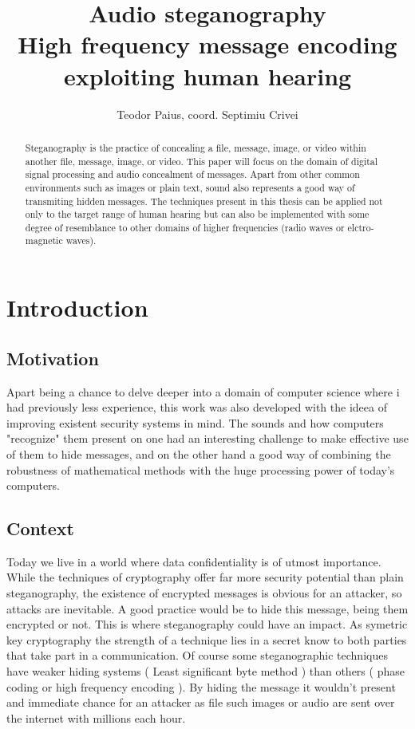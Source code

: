 \documentclass[12pt]{report}
\begin{document}
\title{%
  Audio steganography \\
  \large High frequency message encoding \\
    exploiting human hearing}

\author{Teodor Paius, coord. Septimiu Crivei}

\maketitle

\begin{abstract}
Steganography is the practice of concealing a file, message, image, or video within another file, message, image, or video. This paper will focus on the domain of digital signal processing and audio concealment of messages. Apart from other common environments such as images or plain text, sound also represents a good way of transmiting hidden messages. The techniques present in this thesis can be applied not only to the target range of human hearing but can also be implemented with some degree of resemblance to other domains of higher frequencies (radio waves or elctro-magnetic waves).
\end{abstract}

\tableofcontents


\chapter{Introduction}
\section{Motivation}
Apart being a chance to delve deeper into a domain of computer science where i had previously less experience, this work was also developed with the ideea of improving existent security systems in mind. The sounds and how computers "recognize" them present on one had an interesting challenge to make effective use of them to hide messages, and on the other hand a good way of combining the robustness of mathematical methods with the huge processing power of today's computers.
\section{Context}
Today we live in a world where data confidentiality is of utmost importance. While the techniques of cryptography offer far more security potential than plain steganography, the existence of encrypted messages is obvious for an attacker, so attacks are inevitable. A good practice would be to hide this message, being them encrypted or not. This is where steganography could have an impact. As symetric key cryptography the strength of a technique lies in a secret know to both parties that take part in a communication. Of course some steganographic techniques have weaker hiding systems ( Least significant byte method ) than others ( phase coding or high frequency encoding ). By hiding the message it  wouldn't present and immediate chance for an attacker as file such images or audio are sent over the internet with millions each hour.
\end{document}

